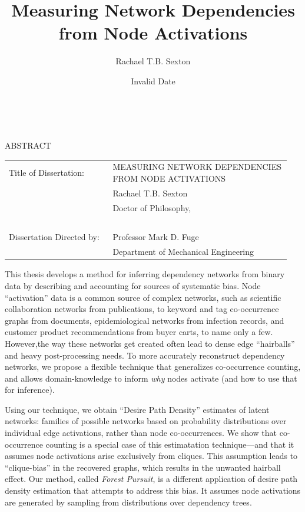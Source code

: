 \documentclass[%
	12pt,
		oneside,
		letterpaper
]{book}
\title{Measuring Network Dependencies from Node Activations}
\author{Rachael T.B. Sexton}
\date{Invalid Date}
\begin{document}
\pagestyle{empty}
\singlespacing

\hbox{\ }

\begin{center}
\large{{ABSTRACT}}

\vspace{3em}

\end{center}
\hspace{-.15in}
\begin{tabular}{p{0.35\linewidth}p{0.6\linewidth}}
Title of Dissertation:     & {\large \uppercase{Measuring Network
Dependencies from Node Activations}}\\
                           & {\large  Rachael T.B. Sexton } \\
                           & {\large Doctor of Philosophy, } \\
\                         \\
Dissertation Directed by:  & {\large Professor Mark D. Fuge } \\
                           & {\large Department of Mechanical
Engineering} \\
\end{tabular}

\vspace{3em}


\doublespacing
\large \normalsize
This thesis develops a method for inferring dependency networks from
binary data by describing and accounting for sources of systematic bias.
Node ``activation'' data is a common source of complex networks, such as
scientific collaboration networks from publications, to keyword and tag
co-occurrence graphs from documents, epidemiological networks from
infection records, and customer product recommendations from buyer
carts, to name only a few. However,the way these networks get created
often lead to dense edge ``hairballs'' and heavy post-processing needs.
To more accurately reconstruct dependency networks, we propose a
flexible technique that generalizes co-occurrence counting, and allows
domain-knowledge to inform \emph{why} nodes activate (and how to use
that for inference).

Using our technique, we obtain ``Desire Path Density'' estimates of
latent networks: families of possible networks based on probability
distributions over individual edge activations, rather than node
co-occurrences. We show that co-occurrence counting is a special case of
this estimatation technique---and that it assumes node activations arise
exclusively from cliques. This assumption leads to ``clique-bias'' in
the recovered graphs, which results in the unwanted hairball effect. Our
method, called \emph{Forest Pursuit}, is a different application of
desire path density estimation that attempts to address this bias. It
assumes node activations are generated by sampling from distributions
over dependency trees.
\end{document}
